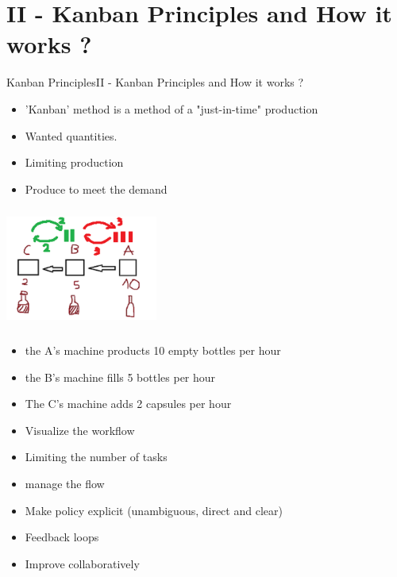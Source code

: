 \documentclass[10pt]{beamer}
\newcommand{\PII}{II - Kanban Principles and How it works ?}
\begin{document}
\section{\PII} 
\begin{frame}{Kanban Principles}{\PII}
    \begin{itemize}
        \item 'Kanban' method is a method of a "just-in-time" production 
        \item Wanted quantities.
        \item Limiting production 
        \item Produce to meet the demand
    \end{itemize}  
\quad \quad  \quad \quad \quad \quad 
\includegraphics[width=5cm, height=4cm]{kanban.PNG}
    \begin{itemize}
        \item the A's machine products 10 empty bottles per hour
        \item the B's machine fills 5 bottles per hour
        \item The C's machine adds 2 capsules per hour
    \end{itemize}  
\end{frame}

\begin{frame}
    \begin{itemize}
        \item Visualize the workflow
        \item Limiting the number of tasks 
        \item manage the flow
        \item Make policy explicit (unambiguous, direct and clear)
        \item Feedback loops
        \item Improve collaboratively 

    \end{itemize}  
\end{frame}
\end{document}
